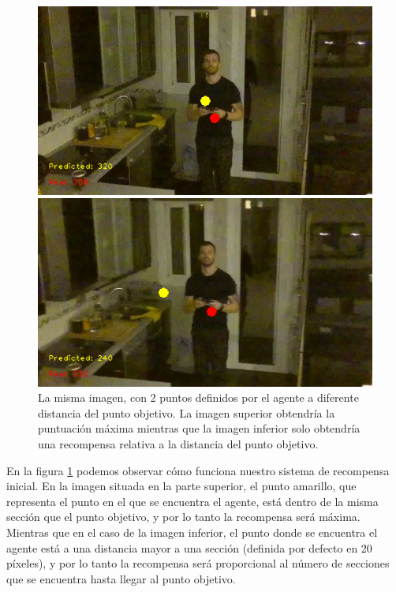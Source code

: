 \begin{figure}[H]
	\centering
	\parbox{5in}{
		\centering
		\includegraphics[scale=0.35]{figuras/recompensa/recompensa_maxima.png}
	}
	\qquad
	\begin{minipage}{5in}
		\centering
		\includegraphics[scale=0.35]{figuras/recompensa/recompensa_no_maxima.png}
	\end{minipage}
	\caption[Comparación de recompensa sobre la misma imagen dados dos puntos de vista distinto.]{La misma imagen, con 2 puntos definidos por el agente a diferente distancia del punto objetivo. La imagen superior obtendría la puntuación máxima mientras que la imagen inferior solo obtendría una recompensa relativa a la distancia del punto objetivo.}%
	\label{fig-recompensa-imagenes}
\end{figure}


En la figura \ref{fig-recompensa-imagenes} podemos observar cómo funciona nuestro sistema de recompensa inicial. En la imagen situada en la parte superior, el punto amarillo, que representa el punto en el que se encuentra el agente, está dentro de la misma sección que el punto objetivo, y por lo tanto la recompensa será máxima. Mientras que en el caso de la imagen inferior, el punto donde se encuentra el agente está a una distancia mayor a una sección (definida por defecto en 20 píxeles), y por lo tanto la recompensa será proporcional al número de secciones que se encuentra hasta llegar al punto objetivo.

